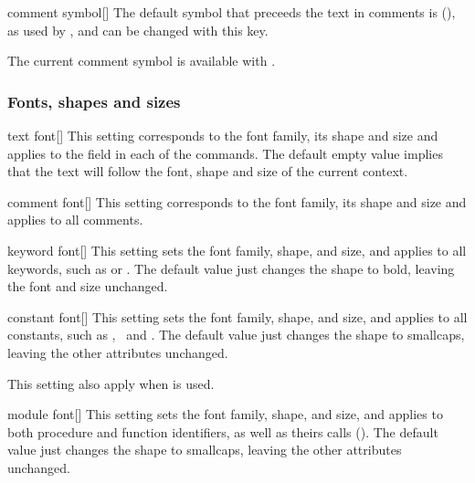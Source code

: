 \documentclass[a4paper, 11pt]{article}
\begin{document}
\begin{option}{comment symbol}{}[]
    The default symbol that preceeds the text in comments is  (\CommentSymbol), as used by , and can be changed with this key.

    The current comment symbol is available with .
\end{option}

\subsubsection{Fonts, shapes and sizes}

\begin{option}{text font}{}[\Empty]
    This setting corresponds to the font family, its shape and size and applies to the  field in each of the commands. The default empty value implies that the text will follow the font, shape and size of the current context.
\end{option}

\begin{option}{comment font}{}[]
    This setting corresponds to the font family, its shape and size and applies to all comments.
\end{option}

\begin{option}{keyword font}{}[]
    This setting sets the font family, shape, and size, and applies to all keywords, such as  or . The default value just changes the shape to bold, leaving the font and size unchanged.
\end{option}

\begin{option}{constant font}{}[]
    This setting sets the font family, shape, and size, and applies to all constants, such as \Nil, \True\ and \False. The default value just changes the shape to smallcaps, leaving the other attributes unchanged.

    This setting also apply when  is used.
\end{option}

\begin{option}{module font}{}[]
    This setting sets the font family, shape, and size, and applies to both procedure and function identifiers, as well as theirs calls (). The default value just changes the shape to smallcaps, leaving the other attributes unchanged.
\end{option}
\end{document}
